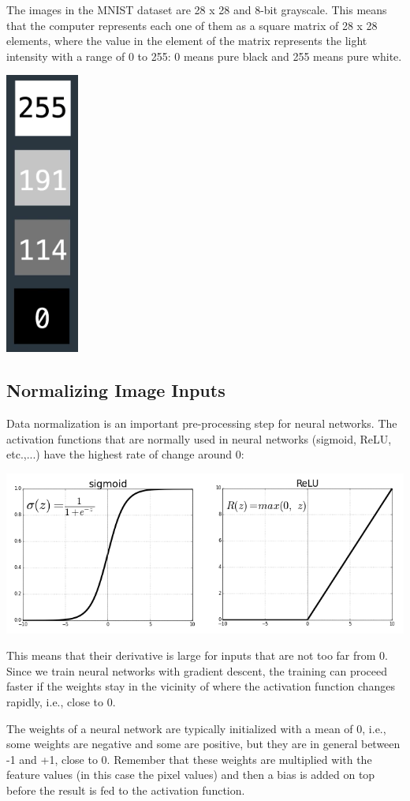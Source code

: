 The images in the MNIST dataset are 28 x 28 and 8-bit grayscale. This means that the computer represents each one of them as a square matrix of 28 x 28 elements, where the value in the element of the matrix represents the light intensity with a range of 0 to 255: 0 means pure black and 255 means pure white.

\includegraphics[width=0.1\linewidth]{img//cnn/image2.png}


\subsection{Normalizing Image Inputs}

Data normalization is an important pre-processing step for neural networks. The activation functions that are normally used in neural networks (sigmoid, ReLU, etc.,...) have the highest rate of change around 0:

\includegraphics[width=1\linewidth]{img//cnn/image3.png}

This means that their derivative is large for inputs that are not too far from 0. Since we train neural networks with gradient descent, the training can proceed faster if the weights stay in the vicinity of where the activation function changes rapidly, i.e., close to 0. \newline

The weights of a neural network are typically initialized with a mean of 0, i.e., some weights are negative and some are positive, but they are in general between -1 and +1, close to 0. Remember that these weights are multiplied with the feature values (in this case the pixel values) and then a bias is added on top before the result is fed to the activation function. \newline

